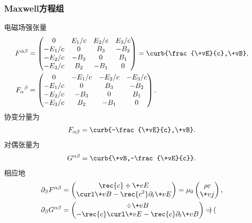 \documentclass[hidelinks]{ctexart}
\begin{document}

\subsubsection{Maxwell方程组} %
\label{ssub:maxwell方程组}

\begin{cenum}
    \item 电磁场强张量
    \begin{align*}
        F^{\alpha\beta} &= \begin{pmatrix}
        0 & E_1/c & E_2/c & E_3/c \\
        -E_1/c & 0 & B_3 & -B_2 \\
        -E_2/c & -B_3 & 0 & B_1 \\
        -E_3/c & B_2 & -B_1 & 0
    \end{pmatrix} = \curb{\frac{\+vE}{c},\+vB}, \\
        {F_\alpha}^\beta &= \begin{pmatrix}
            0 & -E_1/c & -E_2/c & -E_3/c \\
            -E_1/c & 0 & B_3 & -B_2 \\
            -E_2/c & -B_3 & 0 & B_1 \\
            -E_3/c & B_2 & -B_1 & 0
        \end{pmatrix}.
    \end{align*}
    协变分量为
    \[ F_{\alpha\beta} = \curb{-\frac{\+vE}{c},\+vB}. \]
    对偶张量为
    \[ G^{\alpha\beta} = \curb{\+vB,-\frac{\+vE}{c}}. \]
    相应地
    \begin{align*}
        \partial_\beta F^{\alpha\beta} &= \begin{pmatrix}
            \displaystyle \rec{c}\div \+vE \\
            \displaystyle \curl \+vB - \rec{c^2} \partial_t \+vE
        \end{pmatrix} = \mu_0 \begin{pmatrix}
            \rho c \\ \+vj
        \end{pmatrix}, \\
        \partial_\beta G^{\alpha\beta} &= \begin{pmatrix}
            \displaystyle \div \+vB \\
            \displaystyle -\rec{c}\curl \+vE - \rec{c}\partial_t \+vB
        \end{pmatrix} = \begin{pmatrix}

\end{pmatrix}
\end{align*}
\end{cenum}
\end{document}
